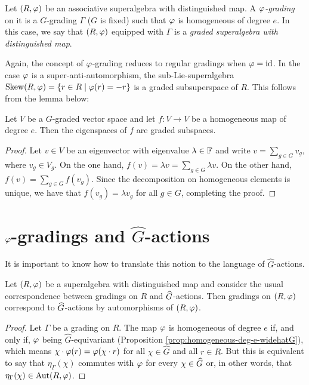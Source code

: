 \begin{defi}
    Let $(R, \varphi)$ be an associative superalgebra with distinguished map. A \emph{$\varphi$-grading} on it is a $G$-grading $\Gamma$ ($G$ is fixed) such that $\varphi$ is homogeneous of degree $e$. In this case, we say that $(R, \varphi)$ equipped with $\Gamma$ is a \emph{graded superalgebra with distinguished map}.
\end{defi}

Again, the concept of $\varphi$-grading reduces to regular gradings when $\varphi = \operatorname{id}$. In the case $\varphi$ is a super-anti-automorphism, the sub-Lie-superalgebra $\operatorname{Skew} (R, \varphi) = \{ r\in R \mid \varphi(r) = -r \}$ is a graded subsuperspace of $R$. This follows from the lemma below:

\begin{lemma}
    Let $V$ be a $G$-graded vector space and let $f: V \to V$ be a homogeneous map of degree $e$. Then the eigenspaces of $f$ are graded subspaces.
\end{lemma}

\begin{proof}
    Let $v\in V$ be an eigenvector with eigenvalue $\lambda \in \mathbb{F}$ and write $v = \sum_{g\in G} v_g$, where $v_g \in V_g$. On the one hand, $f(v) = \lambda v = \sum_{g\in G} \lambda v$. On the other hand, $f(v) = \sum_{g\in G} f(v_g)$. Since the decomposition on homogeneous elements is unique, we have that $f(v_g) = \lambda v_g$ for all $g\in G$, completing the proof.
\end{proof}

\section{$\varphi$-gradings and $\widehat G$-actions}

It is important to know how to translate this notion to the language of $\widehat G$-actions.

\begin{prop}
    Let $(R, \varphi)$ be a superalgebra with distinguished map and consider the usual correspondence between gradings on $R$ and $\widehat G$-actions. Then gradings on $(R, \varphi)$ correspond to $\widehat G$-actions by automorphisms of $(R, \varphi)$.
\end{prop}

\begin{proof}
    Let $\Gamma$ be a grading on $R$. The map $\varphi$ is homogeneous of degree $e$ if, and only if, $\varphi$ being $\widehat G$-equivariant (Proposition \ref{prop:homogeneous-deg-e-widehatG}), which means $\chi\cdot \varphi (r) = \varphi (\chi\cdot r)$ for all $\chi \in \widehat G$ and all $r \in R$. But this is equivalent to say that $\eta_\Gamma(\chi)$ commutes with $\varphi$ for every $\chi \in \widehat G$ or, in other words, that $\eta_\Gamma(\chi) \in \operatorname{Aut} (R, \varphi)$. 
\end{proof}

